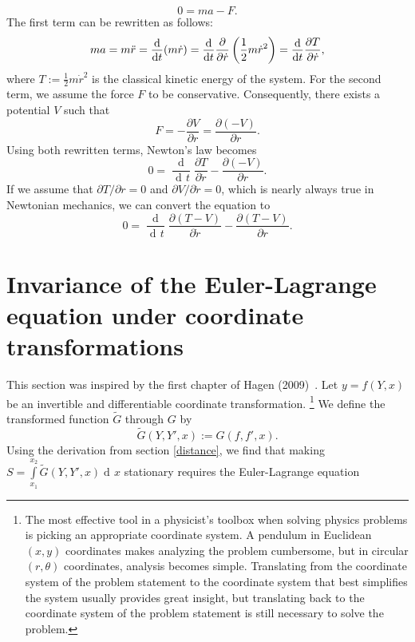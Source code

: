 \documentclass[prb,preprint]{revtex4-1}
\DeclareMathOperator{\dd}{d\!}
\DeclareMathOperator{\ddd}{\mathrm{d}}
\begin{document}
\begin{equation}
0 = ma - F.
\end{equation}
The first term can be rewritten as follows:
\begin{equation}
ma = m \ddot{r} = \frac{\ddd}{\dd t} (m \dot{r})
= \frac{\ddd}{\dd t} \frac{\partial}{\partial \boldmath\dot{r}\unboldmath} \left(\frac{1}{2} m \dot{r}^2 \right)
= \frac{\ddd}{\dd t} \frac{\partial T}{\partial \dot{r}},
\end{equation}
where $T:=\frac{1}{2} m \dot{r}^2$ is the classical kinetic energy of the system. For the second term, we assume the force $F$ to be conservative. Consequently, there exists a potential $V$ such that
\begin{equation}
F = - \frac{\partial V}{\partial r} = \frac{\partial (-V)}{\partial r}.
\end{equation}
Using both rewritten terms, Newton's law becomes
\begin{equation}
0 = \frac{\ddd}{\dd t} \frac{\partial T}{\partial \dot{r}} - \frac{\partial (-V)}{\partial r}.
\end{equation}
If we assume that $\partial T/ \partial r = 0$ and $\partial V / \partial \dot{r} = 0$, which is nearly always true in Newtonian mechanics, we can convert the equation to
\begin{equation}\label{e-lwithtv}
0 = \frac{\ddd}{\dd t} \frac{\partial (T-V)}{\partial \dot{r}} - \frac{\partial (T-V)}{\partial r}.
\end{equation}

\section{Invariance of the Euler-Lagrange equation under coordinate transformations} \label{invariance}

This section was inspired by the first chapter of Hagen (2009)~\cite{hagen2009path}.
Let $y=f(Y,x)$ be an invertible and differentiable coordinate transformation.
\footnote{The most effective tool in a physicist's toolbox when solving physics problems is picking an appropriate coordinate system.
A pendulum in Euclidean $(x,y)$ coordinates makes analyzing the problem cumbersome, but in circular $(r,\theta)$ coordinates, analysis becomes simple. 
Translating from the coordinate system of the problem statement to the coordinate system that best simplifies the system usually provides great insight, but translating back to the coordinate system of the problem statement is still necessary to solve the problem.}
%
We define the transformed function $\widetilde{G}$ through $G$ by
\begin{equation} \label{lagrangian-transform}
\widetilde{G}(Y,Y',x) := G(f,f',x).
\end{equation}
Using the derivation from section \ref{distance}, we find that making $S = \int\limits_{x_1}^{x_2} \widetilde{G}(Y,Y',x) \dd x$ stationary requires the Euler-Lagrange equation
\end{document}
